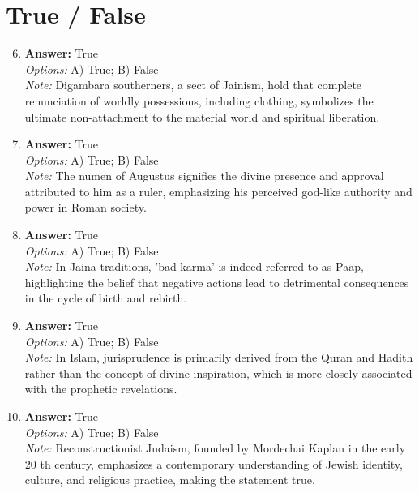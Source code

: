 \documentclass[12pt]{article}
\begin{document}
\section*{True / False}
\begin{enumerate}[label=\arabic*.]
\setcounter{enumi}{5}
\item \textbf{Answer:} True
\\ \textit{Options:} A) True; B) False
\\ \textit{Note:} Digambara southerners, a sect of Jainism, hold that complete renunciation of worldly possessions, including clothing, symbolizes the ultimate non-attachment to the material world and spiritual liberation.
\item \textbf{Answer:} True
\\ \textit{Options:} A) True; B) False
\\ \textit{Note:} The numen of Augustus signifies the divine presence and approval attributed to him as a ruler, emphasizing his perceived god-like authority and power in Roman society.
\item \textbf{Answer:} True
\\ \textit{Options:} A) True; B) False
\\ \textit{Note:} In Jaina traditions, 'bad karma' is indeed referred to as Paap, highlighting the belief that negative actions lead to detrimental consequences in the cycle of birth and rebirth.
\item \textbf{Answer:} True
\\ \textit{Options:} A) True; B) False
\\ \textit{Note:} In Islam, jurisprudence is primarily derived from the Quran and Hadith rather than the concept of divine inspiration, which is more closely associated with the prophetic revelations.
\item \textbf{Answer:} True
\\ \textit{Options:} A) True; B) False
\\ \textit{Note:} Reconstructionist Judaism, founded by Mordechai Kaplan in the early 20 th century, emphasizes a contemporary understanding of Jewish identity, culture, and religious practice, making the statement true.
\end{enumerate}
\end{document}
